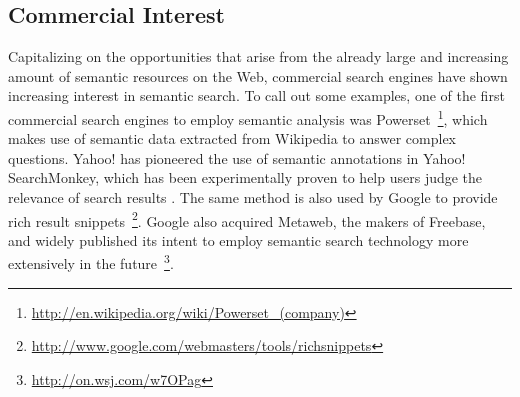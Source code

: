 
\subsection{Commercial Interest}

Capitalizing on the opportunities that arise from the already large and increasing amount of semantic resources on the Web, commercial search engines have shown increasing interest in semantic search. To call out some examples, one of the first commercial search engines to employ semantic analysis was Powerset~\footnote{\url{http://en.wikipedia.org/wiki/Powerset_(company)}}, which makes use of semantic data extracted from Wikipedia to answer complex questions. Yahoo! has pioneered the use of semantic annotations in Yahoo! SearchMonkey, which has been experimentally proven to help users judge the relevance of search results \cite{DBLP:conf/sigir/HaasMTB11}. The same method is also used by Google to provide rich result snippets~\footnote{\url{http://www.google.com/webmasters/tools/richsnippets}}. Google also acquired Metaweb, the makers of Freebase, and widely published its intent to employ semantic search technology more extensively in the future~\footnote{\url{http://on.wsj.com/w7OPag}}. 

